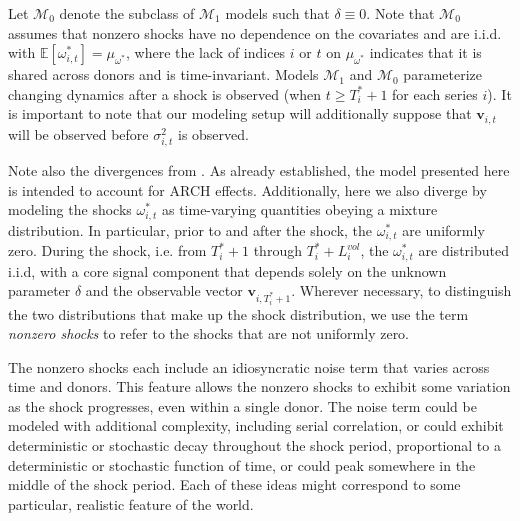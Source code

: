 \documentclass[11pt,3p,review,authoryear]{elsarticle}
\newcommand{\x}{\textbf{v}}
\def\mc#1{\mathcal{#1}} %
\def\E{\mathbb{E}} %
\def\mc#1{\mathcal{#1}}
\theoremstyle{definition}
\begin{document}
    Let $\mc{M}_{0}$ denote the subclass of $\mc{M}_{1}$ models such that $\delta \equiv 0$.  Note that $\mc{M}_{0}$ assumes that nonzero shocks have no dependence on the covariates and are i.i.d. with $\E[ \omega^{*}_{i,t}]=\mu_{\omega^{*}}$, where the lack of indices $i$ or $t$ on $\mu_{\omega^{*}}$ indicates that it is shared across donors and is time-invariant. Models $\mc{M}_{1}$ and $\mc{M}_{0}$ parameterize changing dynamics after a shock is observed (when $t \geq T_i^*+1$ for each series $i$). It is important to note that our modeling setup will additionally suppose that $\x_{i,t}$ will be observed before $\sigma_{i,t}^2$ is observed. 
    
Note also the divergences from \cite{lin2021minimizing}.  As already established, the model presented here is intended to account for ARCH effects.  Additionally, here we also diverge by modeling the shocks $\omega^{*}_{i,t}$ as time-varying quantities obeying a mixture distribution.  In particular, prior to and after the shock, the  $\omega^{*}_{i,t}$  are uniformly zero.  During the shock, i.e. from $T^{*}_{i}+1$ through $T^{*}_{i}+L^{vol}_{i}$, the $\omega^{*}_{i,t}$ are distributed i.i.d, with a core signal component that depends solely on the unknown parameter $\delta$ and the observable vector $\x_{i,T_{i}^{*}+1}$.  Wherever necessary, to distinguish the two distributions that make up the shock distribution, we use the term \textit{nonzero shocks} to refer to the shocks that are not uniformly zero.  

The nonzero shocks each include an idiosyncratic noise term that varies across time and donors.  This feature allows the nonzero shocks to exhibit some variation as the shock progresses, even within a single donor.  The noise term could be modeled with additional complexity, including serial correlation, or could exhibit deterministic or stochastic decay throughout the shock period, proportional to a deterministic or stochastic function of time, or could peak somewhere in the middle of the shock period.  Each of these ideas might correspond to some particular, realistic feature of the world.
\end{document}
